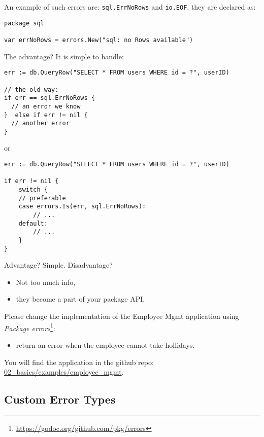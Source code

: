 \documentclass[11pt, letterpaper]{article}
\begin{document}
An example of such errors are: \texttt{sql.ErrNoRows} and \texttt{io.EOF}, they are declared as:

\begin{verbatim}
package sql

var errNoRows = errors.New("sql: no Rows available")
\end{verbatim}

The advantage? It is simple to handle:

\begin{verbatim}
err := db.QueryRow("SELECT * FROM users WHERE id = ?", userID)

// the old way:
if err == sql.ErrNoRows {
  // an error we know
}  else if err != nil { 
  // another error
}
\end{verbatim}

or

\begin{verbatim}
err := db.QueryRow("SELECT * FROM users WHERE id = ?", userID)

if err != nil {
	switch {
	// preferable
	case errors.Is(err, sql.ErrNoRows):
		// ...
	default:
		// ...
	}
}
\end{verbatim}

Advantage? Simple. Disadvantage? \begin{itemize}%
\item Not too much info,
\item they become a part of your package {\small API}.
\end{itemize}%

\bigskip

Please change the implementation of the Employee Mgmt application using \emph{Package errors}\footnote{\href{https://godoc.org/github.com/pkg/errors}{https://godoc.org/github.com/pkg/errors}}: \begin{itemize}%
\item return an error when the employee cannot take hollidays.
\end{itemize}%


You will find the application in the github repo:\\
\href{https://github.com/wojciech11/workshop\_golang/tree/master/02\_basics/examples/employee\_mgmt}{02\_basics/examples/employee\_mgmt}.

\subsection{Custom Error Types}
\end{document}
